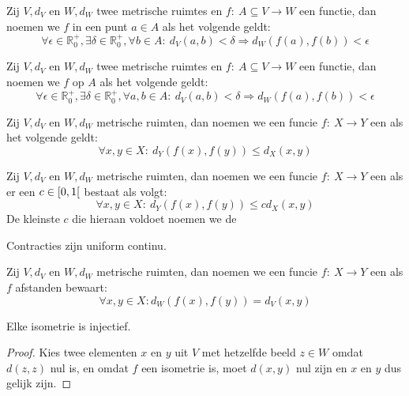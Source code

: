 \documentclass[main.tex]{subfiles}
\begin{document}
\begin{de}
  Zij $V,d_{V}$ en $W,d_{W}$ twee metrische ruimtes en $f:\ A \subseteq V \rightarrow W$ een functie, dan noemen we $f$  in een punt $a\in A$ als het volgende geldt:
  \[ \forall \epsilon \in \mathbb{R}_{0}^{+}, \exists \delta \in \mathbb{R}_{0}^{+}, \forall b \in A:\ d_{V}(a,b)< \delta \Rightarrow d_{W}(f(a),f(b)) < \epsilon \]
\end{de}

\begin{de}
  Zij $V,d_{V}$ en $W,d_{W}$ twee metrische ruimtes en $f:\ A \subseteq V \rightarrow W$ een functie, dan noemen we $f$  op $A$ als het volgende geldt:
  \[ \forall \epsilon \in \mathbb{R}_{0}^{+}, \exists \delta \in \mathbb{R}_{0}^{+}, \forall a,b \in A:\ d_{V}(a,b)< \delta \Rightarrow d_{W}(f(a),f(b)) < \epsilon \]
\end{de}

\begin{de}
  Zij $V,d_{V}$ en $W,d_{W}$ metrische ruimten, dan noemen we een funcie $f:\ X \rightarrow Y$ een  als het volgende geldt:
  \[ \forall x,y\in X:\ d_{Y}(f(x),f(y)) \le d_{X}(x,y) \]
\end{de}

\begin{de}
  Zij $V,d_{V}$ en $W,d_{W}$ metrische ruimten, dan noemen we een funcie $f:\ X \rightarrow Y$ een  als er een $c\in \interval[open right]{0}{1}$ bestaat als volgt:
  \[ \forall x,y\in X:\ d_{Y}(f(x),f(y)) \le c d_{X}(x,y) \]
  De kleinste $c$ die hieraan voldoet noemen we de 
\end{de}

\begin{st}
  Contracties zijn uniform continu.
\end{st}

\begin{de}
  Zij $V,d_{V}$ en $W,d_{W}$ metrische ruimten, dan noemen we een funcie $f:\ X \rightarrow Y$ een  als $f$ afstanden bewaart:
  \[ \forall x,y \in X: d_{W}(f(x),f(y)) = d_{V}(x,y) \]
\end{de}

\begin{st}
  Elke isometrie is injectief.

  \begin{proof}
    Kies twee elementen $x$ en $y$ uit $V$ met hetzelfde beeld $z\in W$ omdat $d(z,z)$ nul is, en omdat $f$ een isometrie is, moet $d(x,y)$ nul zijn en $x$ en $y$ dus gelijk zijn.
  \end{proof}
\end{st}
\end{document}
